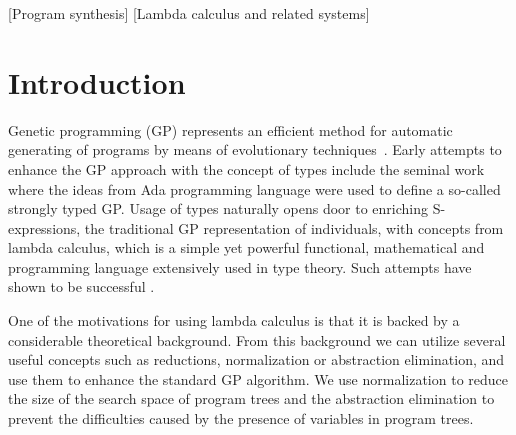 \documentclass{sig-alternate}
\begin{document}


[Program synthesis]
[Lambda calculus and related systems]



\section{Introduction}


Genetic programming (GP) represents an efficient method for automatic generating of programs by means of evolutionary techniques~\cite{koza92,koza03}. Early attempts to enhance the GP approach with the concept of types include the seminal work~\cite{montana95} where the ideas from Ada programming language were used to define a so-called strongly typed GP.   
Usage of types naturally opens door to enriching S-expressions,
the traditional GP representation of individuals, with concepts from
lambda calculus, which is a simple yet powerful functional, mathematical and programming language extensively used in type theory. Such attempts have shown to be successful \cite{yu01}. 

One of the motivations for using lambda calculus is that it is backed by a considerable theoretical background. From this background we can utilize several useful concepts such as reductions, normalization or abstraction elimination, and use them to enhance the standard GP algorithm. We use normalization to reduce the size of the search space of program trees and the abstraction elimination to prevent
the difficulties caused by the presence of variables in program trees.
\end{document}
